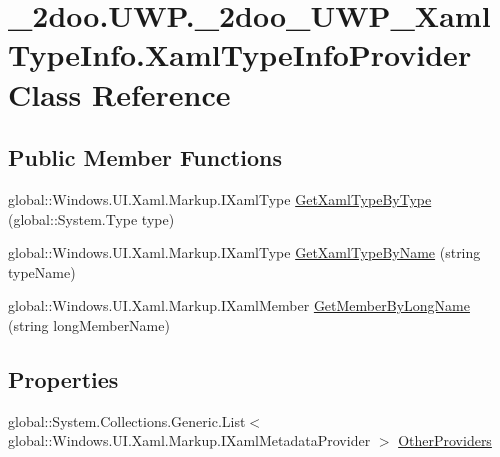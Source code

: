 \hypertarget{class__2doo_1_1_u_w_p_1_1__2doo___u_w_p___xaml_type_info_1_1_xaml_type_info_provider}{
\section{\_\-2doo.UWP.\_\-2doo\_\-UWP\_\-XamlTypeInfo.XamlTypeInfoProvider Class Reference}
\label{class__2doo_1_1_u_w_p_1_1__2doo___u_w_p___xaml_type_info_1_1_xaml_type_info_provider}
}
\subsection*{Public Member Functions}
\begin{CompactItemize}
\item 
global::Windows.UI.Xaml.Markup.IXamlType \hyperlink{class__2doo_1_1_u_w_p_1_1__2doo___u_w_p___xaml_type_info_1_1_xaml_type_info_provider_b6669cae2613d48afbd020b2e9876a95}{GetXamlTypeByType} (global::System.Type type)
\item 
global::Windows.UI.Xaml.Markup.IXamlType \hyperlink{class__2doo_1_1_u_w_p_1_1__2doo___u_w_p___xaml_type_info_1_1_xaml_type_info_provider_a05f2d0d33fc91b799b9c4f257765f28}{GetXamlTypeByName} (string typeName)
\item 
global::Windows.UI.Xaml.Markup.IXamlMember \hyperlink{class__2doo_1_1_u_w_p_1_1__2doo___u_w_p___xaml_type_info_1_1_xaml_type_info_provider_8a8e3e5e3af2fe644249248cc71eae80}{GetMemberByLongName} (string longMemberName)
\end{CompactItemize}
\subsection*{Properties}
\begin{CompactItemize}
\item 
global::System.Collections.Generic.List$<$ global::Windows.UI.Xaml.Markup.IXamlMetadataProvider $>$ \hyperlink{class__2doo_1_1_u_w_p_1_1__2doo___u_w_p___xaml_type_info_1_1_xaml_type_info_provider_11604fabac4e9eb737a66513a87aa490}{OtherProviders}
\end{CompactItemize}
